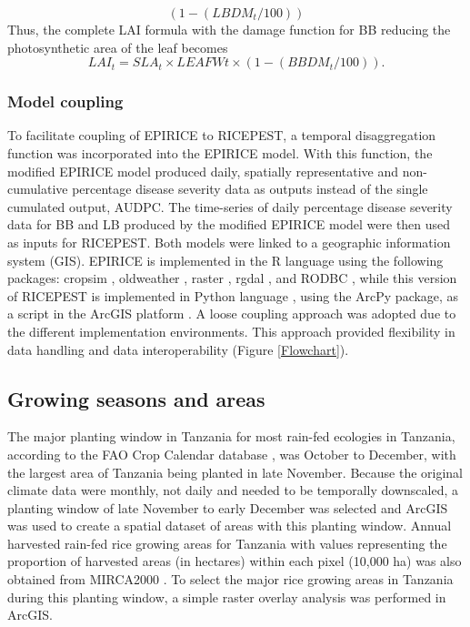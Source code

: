     \begin{equation}
    (1-(LBDM_t /100))
    \label{LBDM}
    \end{equation}
    Thus, the complete LAI formula with the damage function for BB reducing the photosynthetic area of the leaf becomes
     \begin{equation}
    LAI_t = SLA_t \times LEAFWt \times (1-(BBDM_t / 100)).
    \label{LAIBBDM}
    \end{equation}
    
    \subsubsection{Model coupling}
    \label{model_coupling}
    To facilitate coupling of EPIRICE to RICEPEST, a temporal disaggregation function was incorporated into the EPIRICE model. With this function, the modified EPIRICE model produced daily, spatially representative and non-cumulative percentage disease severity data as outputs instead of the single cumulated output, AUDPC. The time-series of daily percentage disease severity data for BB and LB produced by the modified EPIRICE model were then used as inputs for RICEPEST. Both models were linked to a geographic information system (GIS). EPIRICE is implemented in the R language using the following packages: cropsim \citep{Hijmans2009}, oldweather \citep{Hijmans2009}, raster \citep{Hijmans2014}, rgdal \citep{Bivand2014}, and RODBC \citep{Ripley2013}, while this version of RICEPEST is implemented in Python language \citep{python}, using the ArcPy package, as a script in the ArcGIS platform \citep{ESRI2011}. A loose coupling approach was adopted due to the different implementation environments. This approach provided flexibility in data handling and data interoperability (Figure \ref{Flowchart}).
        
    \subsection{Growing seasons and areas}
    \label{growings_seasons}
    The major planting window in Tanzania for most rain-fed ecologies in Tanzania, according to the FAO Crop Calendar database \citep{FAOCropCalendar}, was October to December, with the largest area of Tanzania being planted in late November. Because the original climate data were monthly, not daily and needed to be temporally downscaled, a planting window of late November to early December was selected and ArcGIS was used to create a spatial dataset of areas with this planting window. Annual harvested rain-fed rice growing areas for Tanzania with values representing the proportion of harvested areas (in hectares) within each pixel (10,000 ha) was also obtained from MIRCA2000 \citep{Portmann2010}. To select the major rice growing areas in Tanzania during this planting window, a simple raster overlay analysis was performed in ArcGIS.
    
